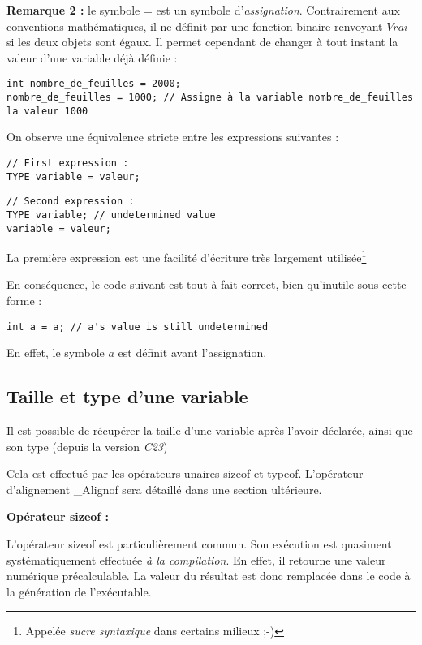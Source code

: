 \documentclass[../../../main.tex]{subfiles}
\begin{document}
\textbf{Remarque 2 :} le symbole \textsf{=} est un symbole d'\textit{assignation}. Contrairement aux conventions mathématiques, il ne définit par une fonction binaire renvoyant $Vrai$ si les deux objets sont égaux. Il permet cependant de changer à tout instant la valeur d'une variable déjà définie :
\begin{verbatim}
int nombre_de_feuilles = 2000;
nombre_de_feuilles = 1000; // Assigne à la variable nombre_de_feuilles la valeur 1000
\end{verbatim}
On observe une équivalence stricte entre les expressions suivantes : 

\begin{minipage}{0.5\textwidth}
\begin{verbatim}
// First expression :
TYPE variable = valeur;

\end{verbatim}
\end{minipage}
\begin{minipage}{0.5\textwidth}
\begin{verbatim}
// Second expression :
TYPE variable; // undetermined value
variable = valeur;
\end{verbatim}
\end{minipage}

La première expression est une facilité d'écriture très largement utilisée\footnote{Appelée \textit{sucre syntaxique} dans certains milieux ;-)}
 
En conséquence, le code suivant est tout à fait correct, bien qu'inutile sous cette forme :
\begin{verbatim}
int a = a; // a's value is still undetermined
\end{verbatim}
En effet, le symbole $a$ est définit avant l'assignation.
\subsection{Taille et type d'une variable}
Il est possible de récupérer la taille d'une variable après l'avoir déclarée, ainsi que son type (depuis la version \textit{C23})
 
Cela est effectué par les opérateurs unaires \textsf{sizeof} et \textsf{typeof}. L'opérateur d'alignement \textsf{\_Alignof} sera détaillé dans une section ultérieure.
 
\textbf{Opérateur \textsf{sizeof} :}
 
L'opérateur \textsf{sizeof} est particulièrement commun. Son exécution est quasiment systématiquement effectuée \textit{à la compilation}. En effet, il retourne une valeur numérique précalculable. La valeur du résultat est donc remplacée dans le code à la génération de l'exécutable.
 
\end{document}
